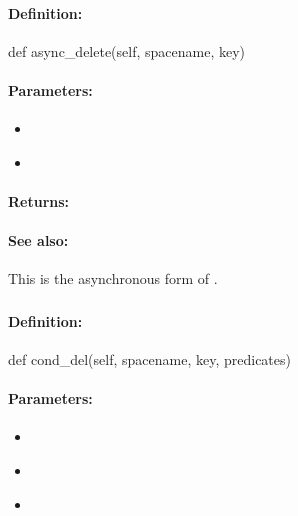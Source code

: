 \paragraph{Definition:}
\begin{pythoncode}
def async_delete(self, spacename, key)
\end{pythoncode}

\paragraph{Parameters:}
\begin{itemize}[noitemsep]
\item {}\\

\item {}\\

\end{itemize}

\paragraph{Returns:}


\paragraph{See also:}  This is the asynchronous form of .

\pagebreak
\subsubsection{}
\label{api:python:cond_del}


\paragraph{Definition:}
\begin{pythoncode}
def cond_del(self, spacename, key, predicates)
\end{pythoncode}

\paragraph{Parameters:}
\begin{itemize}[noitemsep]
\item {}\\

\item {}\\

\item {}\\

\end{itemize}

